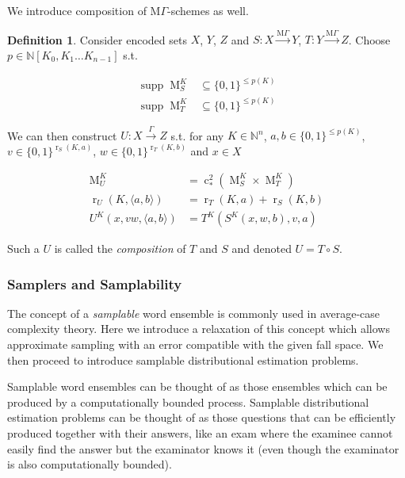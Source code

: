 \documentclass[11pt]{article}
\numberwithin{equation}{section}
\theoremstyle{definition}
\newtheorem{definition}{Definition}[section]
\theoremstyle{plain}
\newcommand{\Bool}{\{0,1\}}
\DeclareMathOperator{\Supp}{supp}
\DeclareMathOperator{\R}{r}
\DeclareMathOperator{\M}{M}
\DeclareMathOperator{\En}{c}
\newcommand{\Nats}{\mathbb{N}}
\newcommand{\NatPoly}{\Nats[K_0, K_1 \ldots K_{n-1}]}
\newcommand{\Chev}[1]{\langle #1 \rangle}
\newcommand{\MGrow}{\mathrm{M}\Gamma}
\newcommand{\Scheme}{\xrightarrow{\Gamma}}
\newcommand{\MScheme}{\xrightarrow{\MGrow}}
\begin{document}
We introduce composition of ${\MGrow}$-schemes as well.

\begin{samepage}
\begin{definition}

Consider encoded sets $X$, $Y$, $Z$ and $S: X \MScheme Y$, $T: Y \MScheme Z$. Choose\\ ${p \in \NatPoly}$ s.t. 

\begin{align*}
\Supp \M_S^K &\subseteq \Bool^{\leq p(K)} \\
\Supp \M_T^K &\subseteq \Bool^{\leq p(K)}
\end{align*}

We can then construct $U: X \Scheme Z$ s.t. for any $K \in \Nats^n$, $a,b \in \Bool^{\leq p(K)}$, ${v \in \Bool^{\R_S(K,a)}}$, ${w \in \Bool^{\R_T(K,b)}}$ and $x \in X$

\begin{align}
\M_U^K &= \En_*^2(\M_S^K \times \M_T^K) \\
\R_U(K, \Chev{a,b}) &= \R_T(K,a)+\R_S(K,b) \\
U^K(x,vw,\Chev{a,b}) &= T^K(S^K(x,w,b),v,a)
\end{align}

Such a $U$ is called the \emph{composition} of $T$ and $S$ and denoted $U = T \circ S$.

\end{definition}
\end{samepage}

\subsubsection{Samplers and Samplability}

The concept of a \emph{samplable} word ensemble is commonly used in average-case complexity theory. Here we introduce a relaxation of this concept which allows approximate sampling with an error compatible with the given fall space. We then proceed to introduce samplable distributional estimation problems.

Samplable word ensembles can be thought of as those ensembles which can be produced by a computationally bounded process. Samplable distributional estimation problems can be thought of as those questions that can be efficiently produced together with their answers, like an exam where the examinee cannot easily find the answer but the examinator knows it (even though the examinator is also computationally bounded).
\end{document}
